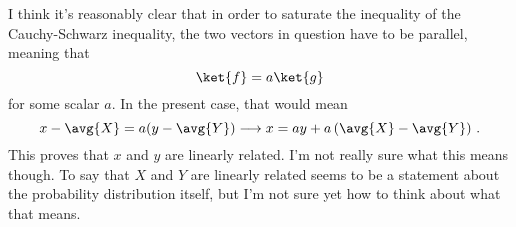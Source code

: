 I think it's reasonably clear that in order to saturate the inequality of the Cauchy-Schwarz inequality, the two vectors in question have to be parallel, meaning that
\begin{equation*}
  \ket{f} = a \ket{g}
\end{equation*}
for some scalar $a$.
In the present case, that would mean
\begin{equation*}
  x - \avg{X} = a (y - \avg{Y}) \longrightarrow x = ay + a \left( \avg{X} - \avg{Y} \right)
  \, .
\end{equation*}
This proves that $x$ and $y$ are linearly related.
I'm not really sure what this means though.
To say that $X$ and $Y$ are linearly related seems to be a statement about the probability distribution itself, but I'm not sure yet how to think about what that means.
